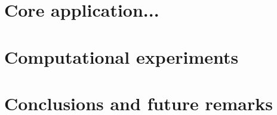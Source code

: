 \documentclass[10pt,conference, compsocconf]{IEEEtran}
\begin{document}
\section{Core application...}
\label{sec:sce}



\section{Computational experiments}
\label{sec:exp}



\section{Conclusions and future remarks}
\label{sec:conc}


%



\end{document}
